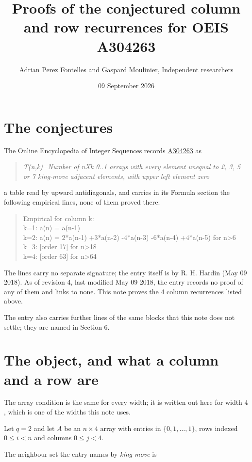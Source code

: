 \documentclass[11pt]{article}
\title{Proofs of the conjectured column and row recurrences for OEIS A304263}
\author{Adrian Perez Fontelles and Gaspard Moulinier, Independent researchers}
\date{09 September 2026}
\theoremstyle{definition}
\begin{document}
\maketitle
\section{The conjectures}

The Online Encyclopedia of Integer Sequences records \href{https://oeis.org/A304263}{A304263} as

\begin{quote}\itshape T(n,k)=Number of nXk 0..1 arrays with every element unequal to 2, 3, 5 or 7 king-move adjacent elements, with upper left element zero\end{quote}

a table read by upward antidiagonals, and carries in its Formula section the following empirical lines, none of them proved there:

\begin{quote}\ttfamily Empirical for column k:\\
k=1: a(n) = a(n-1)\\k=2: a(n) = 2*a(n-1) +3*a(n-2) -4*a(n-3) -6*a(n-4) +4*a(n-5) for n>6\\k=3: [order 17] for n>18\\k=4: [order 63] for n>64\end{quote}

The lines carry no separate signature; the entry itself is by R. H. Hardin (May 09 2018). As of revision 4, last modified May 09 2018, the entry records no proof of any of them and links to none. This note proves the 4 column recurrences listed above.

The entry also carries further lines of the same blocks that this note does not settle; they are named in Section 6.

\section{The object, and what a column and a row are}

The array condition is the same for every width; it is written out here for width $4$, which is one of the widths this note uses.

Let $q = 2$ and let $A$ be an $n \times 4$ array with entries in $\{0,1,\dots,1\}$, rows indexed $0 \le i < n$ and columns $0 \le j < 4$.

The neighbour set the entry names by {\itshape king-move} is
\end{document}
